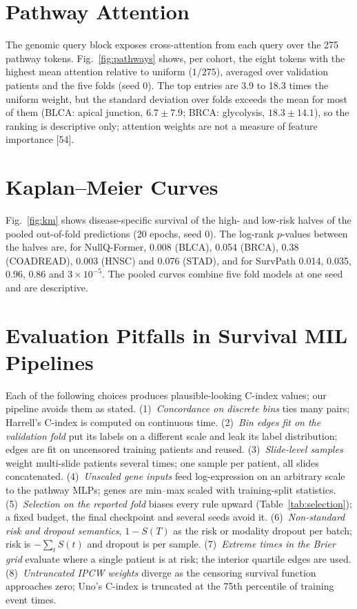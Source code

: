 \documentclass[9pt,journal]{IEEEtran}
\newcommand{\pq}{NullQ-Former}
\newcommand{\cindex}{C-index}
\begin{document}
\section{Pathway Attention}
\label{sec:pathways}
The genomic query block exposes cross-attention from each query over the 275 pathway tokens. Fig.~\ref{fig:pathways} shows, per cohort, the eight tokens with the highest mean attention relative to uniform ($1/275$), averaged over validation patients and the five folds (seed 0). The top entries are 3.9 to 18.3 times the uniform weight, but the standard deviation over folds exceeds the mean for most of them (BLCA: apical junction, $6.7 \pm 7.9$; BRCA: glycolysis, $18.3 \pm 14.1$), so the ranking is descriptive only; attention weights are not a measure of feature importance [54].

\section{Kaplan--Meier Curves}
\label{sec:km}
Fig.~\ref{fig:km} shows disease-specific survival of the high- and low-risk halves of the pooled out-of-fold predictions (20 epochs, seed 0). The log-rank $p$-values between the halves are, for \pq{}, 0.008 (BLCA), 0.054 (BRCA), 0.38 (COADREAD), 0.003 (HNSC) and 0.076 (STAD), and for SurvPath 0.014, 0.035, 0.96, 0.86 and $3 \times 10^{-5}$. The pooled curves combine five fold models at one seed and are descriptive.

\section{Evaluation Pitfalls in Survival MIL Pipelines}
\label{sec:pitfalls}
Each of the following choices produces plausible-looking \cindex{} values; our pipeline avoids them as stated. (1)~\emph{Concordance on discrete bins} ties many pairs; Harrell's \cindex{} is computed on continuous time. (2)~\emph{Bin edges fit on the validation fold} put its labels on a different scale and leak its label distribution; edges are fit on uncensored training patients and reused. (3)~\emph{Slide-level samples} weight multi-slide patients several times; one sample per patient, all slides concatenated. (4)~\emph{Unscaled gene inputs} feed log-expression on an arbitrary scale to the pathway MLPs; genes are min--max scaled with training-split statistics. (5)~\emph{Selection on the reported fold} biases every rule upward (Table~\ref{tab:selection}); a fixed budget, the final checkpoint and several seeds avoid it. (6)~\emph{Non-standard risk and dropout semantics}, $1 - S(T)$ as the risk or modality dropout per batch; risk is $-\sum_t S(t)$ and dropout is per sample. (7)~\emph{Extreme times in the Brier grid} evaluate where a single patient is at risk; the interior quartile edges are used. (8)~\emph{Untruncated IPCW weights} diverge as the censoring survival function approaches zero; Uno's \cindex{} is truncated at the 75th percentile of training event times.
\end{document}
